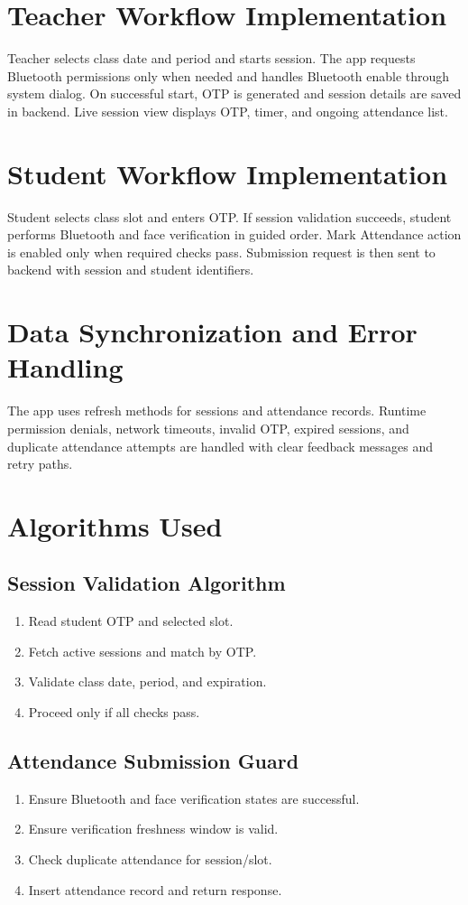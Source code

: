 \documentclass[12pt,a4paper]{report}
\begin{document}
\section{Teacher Workflow Implementation}
Teacher selects class date and period and starts session. The app requests Bluetooth permissions only when needed and handles Bluetooth enable through system dialog. On successful start, OTP is generated and session details are saved in backend. Live session view displays OTP, timer, and ongoing attendance list.

\section{Student Workflow Implementation}
Student selects class slot and enters OTP. If session validation succeeds, student performs Bluetooth and face verification in guided order. Mark Attendance action is enabled only when required checks pass. Submission request is then sent to backend with session and student identifiers.

\section{Data Synchronization and Error Handling}
The app uses refresh methods for sessions and attendance records. Runtime permission denials, network timeouts, invalid OTP, expired sessions, and duplicate attendance attempts are handled with clear feedback messages and retry paths.

\section{Algorithms Used}
\subsection{Session Validation Algorithm}
\begin{enumerate}[leftmargin=1.5cm]
\item Read student OTP and selected slot.
\item Fetch active sessions and match by OTP.
\item Validate class date, period, and expiration.
\item Proceed only if all checks pass.
\end{enumerate}

\subsection{Attendance Submission Guard}
\begin{enumerate}[leftmargin=1.5cm]
\item Ensure Bluetooth and face verification states are successful.
\item Ensure verification freshness window is valid.
\item Check duplicate attendance for session/slot.
\item Insert attendance record and return response.
\end{enumerate}
\end{document}
